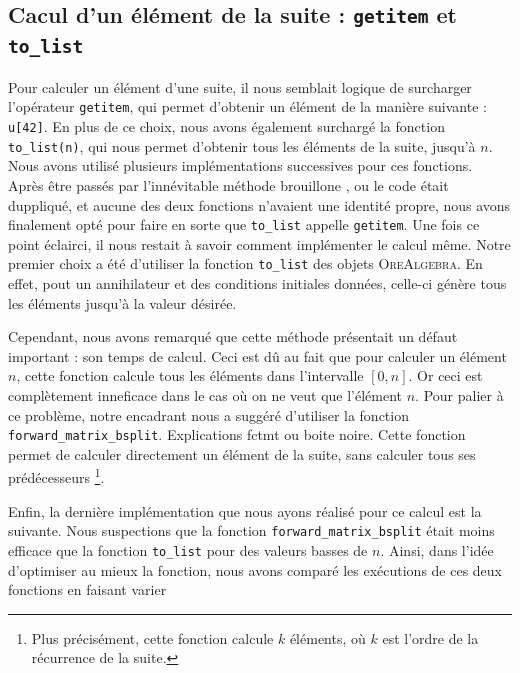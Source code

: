 \documentclass[12pt]{article}
\newlength{\charwidth}
\newcommand{\uline}{\underline{\hspace{2\charwidth}}}
\begin{document}
    \subsection{Cacul d'un élément de la suite : \texttt{\uline getitem\uline } et \texttt{to\_list}}
        Pour calculer un élément d'une suite, il nous semblait logique de surcharger l'opérateur
        \texttt{\uline getitem\uline }, qui permet d'obtenir un élément de la manière suivante : 
        \texttt{u[42]}. En plus de ce choix, nous avons également surchargé la fonction
        \texttt{to\_list(n)}, qui nous permet d'obtenir tous les éléments de la suite, jusqu'à $n$.
        Nous avons utilisé plusieurs implémentations successives pour ces fonctions.
        Après être passés par l'innévitable \og méthode brouillone \fg, ou le code était duppliqué,
        et aucune des deux fonctions n'avaient une identité propre, nous avons finalement opté pour
        faire en sorte que \texttt{to\_list} appelle \texttt{\uline getitem\uline }. Une fois ce point
        éclairci, il nous restait à savoir comment implémenter le calcul même. Notre premier choix
        a été d'utiliser la fonction \texttt{to\_list} des objets \textsc{OreAlgebra}. En effet,
        pout un annihilateur et des conditions initiales données, celle-ci génère tous les éléments
        jusqu'à la valeur désirée.
        \par Cependant, nous avons remarqué que cette méthode présentait un défaut important : son
        temps de calcul. Ceci est dû au fait que pour calculer un élément $n$, cette fonction
        calcule tous les éléments dans l'intervalle $[0,n]$. Or ceci est complètement inneficace
        dans le cas où on ne veut que l'élément $n$. Pour palier à ce problème, notre encadrant nous 
        a suggéré d'utiliser la fonction \texttt{forward\_matrix\_bsplit}.
        {\color{red} Explications fctmt ou boite noire.}
        Cette fonction permet de calculer directement un élément de la suite, sans calculer tous ses
        prédécesseurs
        \footnote{Plus précisément, cette fonction calcule $k$ éléments, où  $k$ est l'ordre de la
        récurrence de la suite.}.
        \par Enfin, la dernière implémentation que nous ayons réalisé pour ce calcul est la suivante.
        Nous suspections que la fonction \texttt{forward\_matrix\_bsplit} était moins efficace que la
        fonction \texttt{to\_list} pour des valeurs basses de $n$. Ainsi, dans l'idée d'optimiser au
        mieux la fonction, nous avons comparé les exécutions de ces deux fonctions en faisant varier
\end{document}
